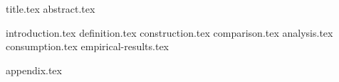 \documentclass[11pt]{llncs}
\begin{document}
{title.tex}
\thispagestyle{plain}
{abstract.tex}

{introduction.tex}
{definition.tex}
{construction.tex}
{comparison.tex}
{analysis.tex}
{consumption.tex}
{empirical-results.tex}




\newpage
\appendix
{appendix.tex}
\end{document}
